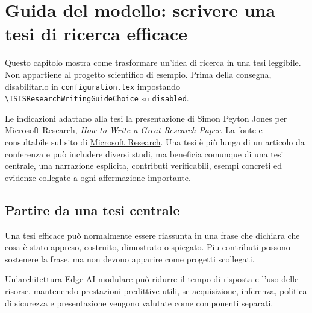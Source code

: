 
\chapter{Guida del modello: scrivere una tesi di ricerca efficace}\label{ch:writing-guide-it}

\begin{keypoint}
Questo capitolo mostra come trasformare un'idea di ricerca in una tesi leggibile.
Non appartiene al progetto scientifico di esempio. Prima della consegna,
disabilitarlo in \texttt{configuration.tex} impostando
\texttt{\textbackslash ISISResearchWritingGuideChoice} su \texttt{disabled}.
\end{keypoint}

Le indicazioni adattano alla tesi la presentazione di Simon Peyton Jones per
Microsoft Research, \emph{How to Write a Great Research Paper}. La fonte e
consultabile sul sito di
\href{https://www.microsoft.com/en-us/research/wp-content/uploads/2016/07/How-to-write-a-great-research-paper.pdf}{Microsoft Research}.
Una tesi è più lunga di un articolo da conferenza e può includere diversi studi,
ma beneficia comunque di una tesi centrale, una narrazione esplicita,
contributi verificabili, esempi concreti ed evidenze collegate a ogni
affermazione importante.

\section{Partire da una tesi centrale}
Una tesi efficace può normalmente essere riassunta in una frase che dichiara
che cosa è stato appreso, costruito, dimostrato o spiegato. Piu contributi
possono sostenere la frase, ma non devono apparire come progetti scollegati.

\begin{researchquestion}
Un'architettura Edge-AI modulare può ridurre il tempo di risposta e l'uso delle
risorse, mantenendo prestazioni predittive utili, se acquisizione, inferenza,
politica di sicurezza e presentazione vengono valutate come componenti separati.
\end{researchquestion}

